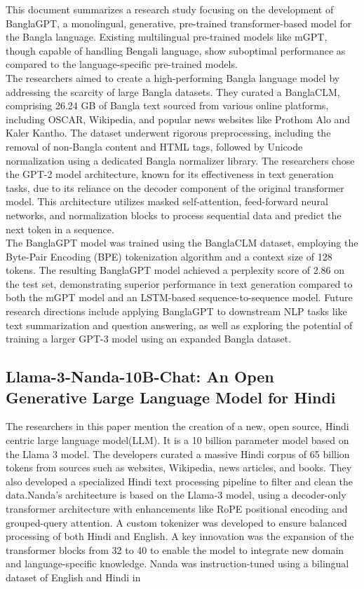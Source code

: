 This document summarizes a research study focusing on the development of BanglaGPT, a monolingual, generative, pre-trained transformer-based model for the Bangla language. Existing multilingual pre-trained models like mGPT, though capable of handling Bengali language, show suboptimal performance as compared to the language-specific pre-trained models.\\
The researchers aimed to create a high-performing Bangla language model by addressing the scarcity of large Bangla datasets. They curated a BanglaCLM, comprising 26.24 GB of Bangla text sourced from various online platforms, including OSCAR, Wikipedia, and popular news websites like Prothom Alo and Kaler Kantho. The dataset underwent rigorous preprocessing, including the removal of non-Bangla content and HTML tags, followed by Unicode normalization using a dedicated Bangla normalizer library.
The researchers chose the GPT-2 model architecture, known for its effectiveness in text generation tasks, due to its reliance on the decoder component of the original transformer model. This architecture utilizes masked self-attention, feed-forward neural networks, and normalization blocks to process sequential data and predict the next token in a sequence.\\
The BanglaGPT model was trained using the BanglaCLM dataset, employing the Byte-Pair Encoding (BPE) tokenization algorithm and a context size of 128 tokens. The resulting BanglaGPT model achieved a perplexity score of 2.86 on the test set, demonstrating superior performance in text generation compared to both the mGPT model and an LSTM-based sequence-to-sequence model. Future research directions include applying BanglaGPT to downstream NLP tasks like text summarization and question answering, as well as exploring the potential of training a larger GPT-3 model using an expanded Bangla dataset.

\subsection{Llama-3-Nanda-10B-Chat: An Open Generative Large Language Model for Hindi}

The researchers in this paper mention the creation of a new, open source, Hindi centric large language model(LLM). It is a 10 billion parameter model based on the Llama 3 model. The developers curated a massive Hindi corpus of 65 billion tokens from sources such as websites, Wikipedia, news articles, and books. They also developed a specialized Hindi text processing pipeline to filter and clean the data.Nanda’s architecture is based on the Llama-3 model, using a decoder-only transformer architecture with enhancements like RoPE positional encoding and grouped-query attention. A custom tokenizer was developed to ensure balanced processing of both Hindi and English. A key innovation was the expansion of the transformer blocks from 32 to 40 to enable the model to integrate new domain and language-specific knowledge. Nanda was instruction-tuned using a bilingual dataset of English and Hindi in

